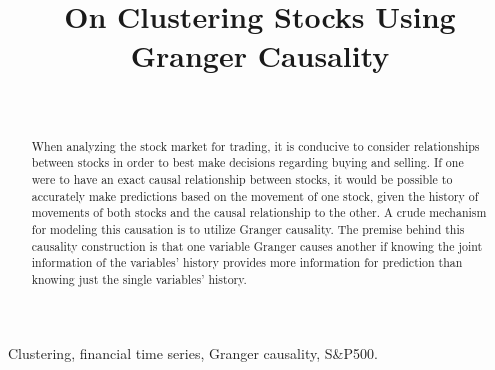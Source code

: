\documentclass[conference]{IEEEtran}
\begin{document}
\title{On Clustering Stocks Using Granger Causality}

\author{
\\
}

\maketitle


\begin{abstract}
When analyzing the stock market for trading, it is conducive to consider relationships between stocks in order to best make decisions regarding buying and selling. If one were to have an exact causal relationship between stocks, it would be possible to accurately make predictions based on the movement of one stock, given the history of movements of both stocks and the causal relationship to the other. A crude mechanism for modeling this causation is to utilize Granger causality. The premise behind this causality construction is that one variable Granger causes another if knowing the joint information of the variables' history provides more information for prediction than knowing just the single variables' history.

 
\end{abstract}
\hfill

\begin{IEEEkeywords}
Clustering, financial time series, Granger causality, S\&P500.
\end{IEEEkeywords}
\end{document}
